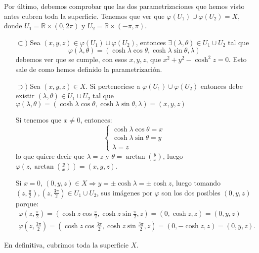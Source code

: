 Por último, debemos comprobar que las dos parametrizaciones que hemos visto
antes cubren toda la superficie. Tenemos que ver que $\varphi\left( U_1 \right) \cup
\varphi\left( U_2 \right) = X$, donde $U_1 = \mathbb{R} \times \left( 0, 2 \pi
\right) $ y $U_2 = \mathbb{R} \times \left( -\pi, \pi \right)$.
\begin{itemize}
\item[$\subset)$] Sea $\left( x, y, z \right) \in \varphi\left( U_1 \right)
    \cup \varphi\left( U_2 \right)$, entonces $\exists \left( \lambda, \theta
    \right) \in U_1 \cup U_2$ tal que
    \[
        \varphi\left( \lambda, \theta \right) =
        \left( \cosh \lambda \cos \theta, \cosh \lambda \sin \theta, \lambda \right)
    \]
    debemos ver que se cumple, con esos $x, y, z$, que $x^2 + y^2 - \cosh^2 z =
    0$. Esto sale de como hemos definido la parametrización. 

\item[$\supset)$] Sea $\left( x, y, z \right) \in X$. Si perteneciese a
    $\varphi\left( U_1 \right) \cup \varphi\left( U_2 \right)$ entonces debe
    existir $\left( \lambda, \theta \right) \in U_1 \cup U_2$ tal que
    $\varphi\left( \lambda, \theta \right) = \left( \cosh \lambda \cos \theta,
    \cosh \lambda \sin \theta, \lambda \right) = \left( x, y, z \right)$

    Si tenemos que $x \neq  0$, entonces:
    \[
    \begin{cases}
        \cosh \lambda \cos \theta = x\\
        \cosh \lambda \sin \theta = y\\
        \lambda = z
    \end{cases}
    \]
    lo que quiere decir que $\lambda = z$ y $\theta = \arctan\left( \frac{y}{x}
    \right)$, luego $\varphi\left( z, \arctan\left( \frac{y}{x} \right) \right)
    = \left( x, y, z \right)$.

    Si $x = 0$, $\left( 0, y, z \right) \in X \Rightarrow y = \pm \cosh \lambda
    = \pm \cosh z$, luego tomando $\left( z, \frac{\pi}{2} \right), \left( z,
    \frac{3 \pi}{2} \right) \in U_1 \cup U_2$, sus imágenes por $\varphi$ son
    los dos posibles $\left( 0, y, z\right)$ porque: 
    \begin{gather*}
        \varphi\left( z, \frac{\pi}{2} \right) = \left( \cosh z \cos
        \frac{\pi}{2}, \cosh z \sin \frac{\pi}{2}, z \right) = \left( 0, \cosh
        z, z \right) = \left( 0, y, z \right)\\ 
        \varphi\left( z, \frac{3\pi}{2}
        \right) = \left( \cosh z \cos \frac{3\pi}{2}, \cosh z \sin \frac{3\pi}{2}, z
        \right) = \left( 0, -\cosh z, z \right) = \left( 0, y, z \right).
    \end{gather*}
\end{itemize}
En definitiva, cubrimos toda la superficie $X$.
